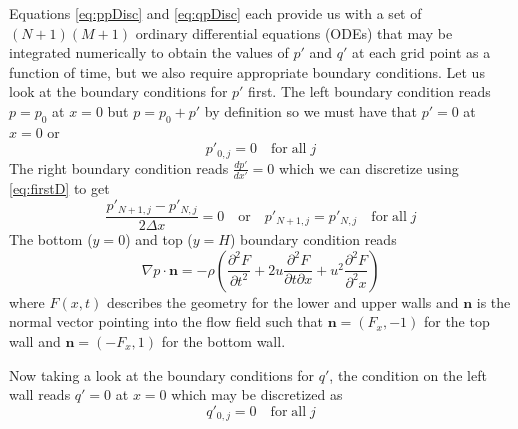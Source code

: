 \documentclass[11pt]{article}
\begin{document}
Equations \eqref{eq:ppDisc} and \eqref{eq:qpDisc} each provide us with a set of $(N+1)(M+1)$ ordinary differential equations (ODEs) that may be integrated numerically to obtain the values of $p'$ and $q'$ at each grid point as a function of time, but we also require appropriate boundary conditions. Let us look at the boundary conditions for $p'$ first. The left boundary condition reads $p = p_0$ at $x = 0$ but $p = p_0 + p'$ by definition so we must have that $p' = 0$ at $x = 0$ or
\begin{equation}
  p'_{0,j} = 0 \quad \mathrm{for \; all} \; j
\end{equation}
The right boundary condition reads $\displaystyle \frac{dp'}{dx'} = 0$ which we can discretize using \eqref{eq:firstD} to get
\begin{equation}
  \frac{p'_{N+1,j} - p'_{N,j}}{2\Delta x} = 0 \quad \mathrm{or} \quad p'_{N+1,j} = p'_{N,j} \quad \mathrm{for \; all} \; j
\end{equation}
The bottom ($y=0$) and top ($y=H$) boundary condition reads 
\begin{equation}
  \nabla p \cdot \mathbf{n} = -\rho \left( \frac{\partial^2 F}{\partial t^2} + 2u\frac{\partial^2 F}{\partial t \partial x} + u^2 \frac{\partial^2 F}{\partial^2 x} \right)
\end{equation}
where $F(x,t)$ describes the geometry for the lower and upper walls and $\mathbf{n}$ is the normal vector pointing into the flow field such that $\mathbf{n} = (F_x, -1)$ for the top wall and $\mathbf{n} = (-F_x, 1)$ for the bottom wall.

Now taking a look at the boundary conditions for $q'$, the condition on the left wall reads $q' = 0$ at $x = 0$ which may be discretized as
\begin{equation}
q'_{0,j} = 0 \quad \mathrm{for \; all} \; j
\end{equation}
\end{document}
